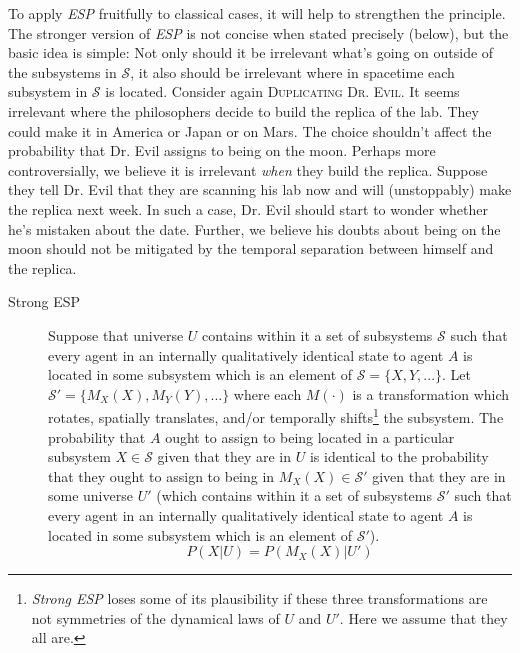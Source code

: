\documentclass[12pt,onecolumn,secnumarabic,amsmath,amssymb,balancelastpage,nofootinbib]{article}
\begin{document}
To apply \emph{ESP} fruitfully to classical cases, it will help to strengthen the principle.  The stronger version of \emph{ESP} is not concise when stated precisely (below), but the basic idea is simple:  Not only should it be irrelevant what's going on outside of the subsystems in $\mathcal{S}$, it also should be irrelevant where in spacetime each subsystem in $\mathcal{S}$ is located.  Consider again \textsc{Duplicating Dr. Evil}.  It seems irrelevant where the philosophers decide to build the replica of the lab.  They could make it in America or Japan or on Mars.  The choice shouldn't affect the probability that Dr. Evil assigns to being on the moon.  Perhaps more controversially, we believe it is irrelevant \emph{when} they build the replica.  Suppose they tell Dr. Evil that they are scanning his lab now and will (unstoppably) make the replica next week.  In such a case, Dr. Evil should start to wonder whether he's mistaken about the date.  Further, we believe his doubts about being on the moon should not be mitigated by the temporal separation between himself and the replica.
\begin{description}
\item[Strong ESP]  
Suppose that universe $U$ contains within it a set of subsystems $\mathcal{S}$ such that every agent in an internally qualitatively identical state to agent $A$ is located in some subsystem which is an element of $\mathcal{S}=\{X,Y,...\}$.  Let $\mathcal{S}'=\{M_X(X),M_Y(Y),...\}$ where each $M(\cdot)$ is a transformation which rotates, spatially translates, and/or temporally shifts\footnote{\emph{Strong ESP} loses some of its plausibility if these three transformations are not symmetries of the dynamical laws of $U$ and $U'$.  Here we assume that they all are.} the subsystem.  The probability that $A$ ought to assign to being located in a particular subsystem $X\in\mathcal{S}$ given that they are in $U$ is identical to the probability that they ought to assign to being in $M_X(X)\in\mathcal{S}'$ given that they are in some universe $U'$ (which contains within it a set of subsystems $\mathcal{S}'$ such that every agent in an internally qualitatively identical state to agent $A$ is located in some subsystem which is an element of $\mathcal{S}'$).
\begin{equation}
P(X|U)=P(M_X(X)|U')
\label{sesp}
\end{equation}
\end{description}
\end{document}
